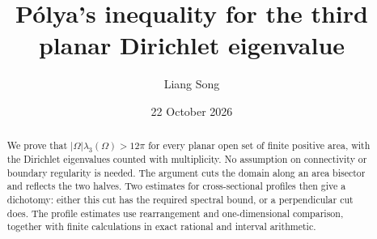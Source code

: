 \documentclass[11pt]{article}
\title{P\'olya's inequality for the third planar Dirichlet eigenvalue}
\author{Liang Song}
\date{22 October 2026}
\theoremstyle{remark}\newtheorem{remark}[theorem]{Remark}
\begin{document}
\maketitle
\begin{abstract}
We prove that $|\Omega|\lambda_3(\Omega)>12\pi$ for every planar open set of finite positive area, with the Dirichlet eigenvalues counted with multiplicity. No assumption on connectivity or boundary regularity is needed. The argument cuts the domain along an area bisector and reflects the two halves. Two estimates for cross-sectional profiles then give a dichotomy: either this cut has the required spectral bound, or a perpendicular cut does. The profile estimates use rearrangement and one-dimensional comparison, together with finite calculations in exact rational and interval arithmetic.
\end{abstract}





\end{document}
